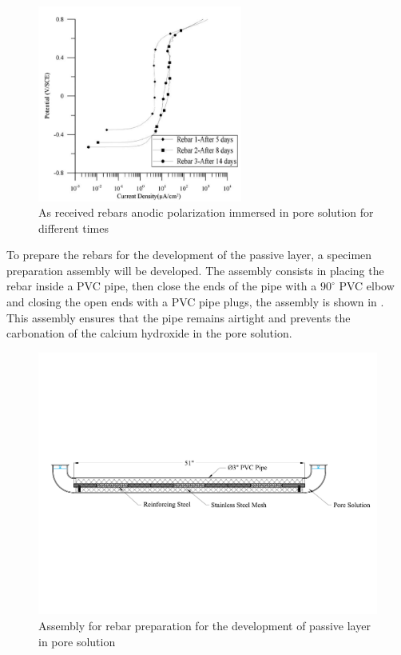 \begin{figure}[htbp]
	\centering
	\includegraphics[width=0.6\textwidth]{Chapter-3/figs/AsReceived_AnodicPolarization_time}
	\caption{As received rebars anodic polarization immersed in pore solution for different times\cite{Ghods2009}}
	\label{fig:GhodsRebarPassivation}
\end{figure}

To prepare the rebars for the development of the passive layer, a specimen preparation assembly will be developed. The assembly consists in placing the rebar inside a PVC pipe, then close the ends of the pipe  with a $90^{\circ}$ PVC elbow and closing the open ends with a PVC pipe plugs, the assembly is shown in . This assembly ensures that the pipe remains airtight and prevents the carbonation of the calcium hydroxide in the pore solution.

\begin{figure}[htbp]
	\centering
	\includegraphics[width=1.0\textwidth]{Chapter-3/figs/AnodicPolarization_01}
	\caption{Assembly for rebar preparation for the development of passive layer in pore solution}
	\label{fig:RebarPassivation}
\end{figure}


